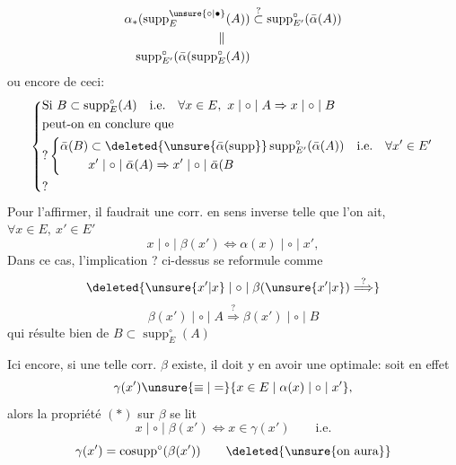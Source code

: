 \[
\begin{aligned}
\alpha_*(\operatorname{supp}^{\unsure{\circ|\bullet}}_E(A))&\overset{?}{\subset}\operatorname{supp}^{\circ}_{E'}(\bar\alpha(A))\\
\Vert\qquad&\\
\operatorname{supp}^{\circ}_{E'}(\bar\alpha(\operatorname{supp}^{\circ}_E(A))&
\end{aligned}
\]
ou encore de ceci:
\[
\left\{\begin{aligned}
&\text{Si }B\subset\operatorname{supp}^{\circ}_E(A)\quad\text{i.e.}\quad\forall x\in E,\ x\mid\circ\mid A\Rightarrow x\mid\circ\mid B\\
&\text{peut-on en conclure que}\\
&?\left\{\begin{aligned}
\bar\alpha(B)&\subset\deleted{\unsure{\bar\alpha(\operatorname{supp}}}\operatorname{supp}^{\circ}_{E'}(\bar\alpha(A))\quad\text{i.e.}\quad\forall x'\in E'\\
&x'\mid\circ\mid\bar\alpha(A)\Rightarrow x'\mid\circ\mid\bar\alpha(B
\end{aligned}\right.\\
&\hfill ?
\end{aligned}\right.
\]
Pour l'affirmer, il faudrait une corr. en sens inverse
telle que l'on ait, $\forall x\in E,\ x'\in E'$
\[
x\mid\circ\mid\beta(x')\Longleftrightarrow\alpha(x)\mid\circ\mid x',\tag*{$(*)$}
\]
Dans ce cas, l'implication ? ci-dessus se  reformule comme
\[
\deleted{\unsure{x'|x}\mid\circ\mid\beta(\unsure{x'|x})\overset{?}{\Longrightarrow}}
\]
\[
\beta(x')\mid\circ\mid A\overset{?}{\Longrightarrow}\beta(x')\mid\circ\mid B
\]
qui résulte bien de $B\subset\operatorname{supp}^{\circ}_E(A)$

Ici encore, si une telle corr. $\beta$ existe, il doit y en avoir une optimale: soit en effet
\[
\gamma(x')\unsure{\equiv|=}\{x\in E\mid\alpha(x)\mid\circ\mid x'\},
\]
alors la propriété $(*)$ sur $\beta$ se lit
\[
x\mid\circ\mid\beta(x')\Longleftrightarrow x\in\gamma(x')\qquad\text{i.e.}
\]
\[
\gamma(x')=\operatorname{cosupp}^{\circ}(\beta(x'))\qquad\deleted{\text{\unsure{on aura}}}
\]

